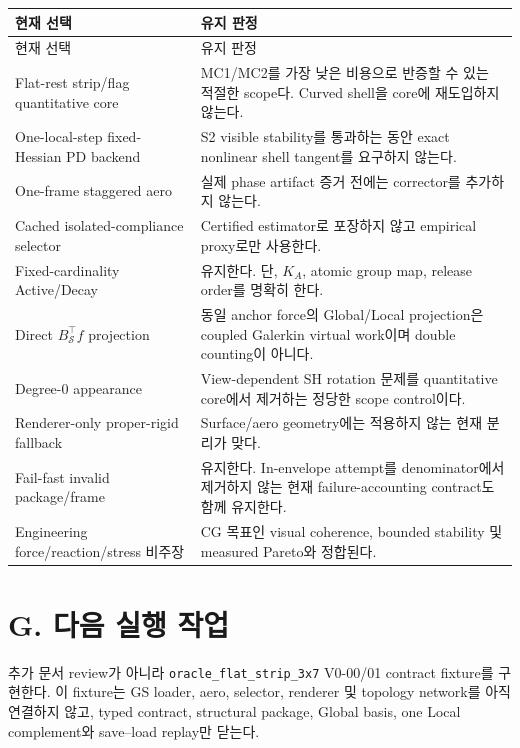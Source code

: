 \documentclass[11pt]{article}
\newcommand{\code}[1]{\texttt{\small #1}}
\begin{document}
\begin{longtable}{L{0.29\textwidth}L{0.61\textwidth}}
\toprule
현재 선택 & 유지 판정 \\
\midrule
\endfirsthead
\toprule
현재 선택 & 유지 판정 \\
\midrule
\endhead
Flat-rest strip/flag quantitative core & MC1/MC2를 가장 낮은 비용으로 반증할 수 있는 적절한 scope다. Curved shell을 core에 재도입하지 않는다. \\
One-local-step fixed-Hessian PD backend & S2 visible stability를 통과하는 동안 exact nonlinear shell tangent를 요구하지 않는다. \\
One-frame staggered aero & 실제 phase artifact 증거 전에는 corrector를 추가하지 않는다. \\
Cached isolated-compliance selector & Certified estimator로 포장하지 않고 empirical proxy로만 사용한다. \\
Fixed-cardinality Active/Decay & 유지한다. 단, $K_A$, atomic group map, release order를 명확히 한다. \\
Direct $B_{\mathcal S}^{\top}f$ projection & 동일 anchor force의 Global/Local projection은 coupled Galerkin virtual work이며 double counting이 아니다. \\
Degree-0 appearance & View-dependent SH rotation 문제를 quantitative core에서 제거하는 정당한 scope control이다. \\
Renderer-only proper-rigid fallback & Surface/aero geometry에는 적용하지 않는 현재 분리가 맞다. \\
Fail-fast invalid package/frame & 유지한다. In-envelope attempt를 denominator에서 제거하지 않는 현재 failure-accounting contract도 함께 유지한다. \\
Engineering force/reaction/stress 비주장 & CG 목표인 visual coherence, bounded stability 및 measured Pareto와 정합된다. \\
\bottomrule
\end{longtable}

\section{G. 다음 실행 작업}

\begin{tcolorbox}[
  colback=CoreLight,
  colframe=CoreBlue,
  title=지금 수행할 가장 작은 구현 단위,
  fonttitle=\bfseries
]
추가 문서 review가 아니라 \code{oracle\_flat\_strip\_3x7} V0-00/01 contract fixture를 구현한다.
이 fixture는 GS loader, aero, selector, renderer 및 topology network를 아직 연결하지 않고,
typed contract, structural package, Global basis, one Local complement와 save--load replay만 닫는다.
\end{tcolorbox}
\end{document}
